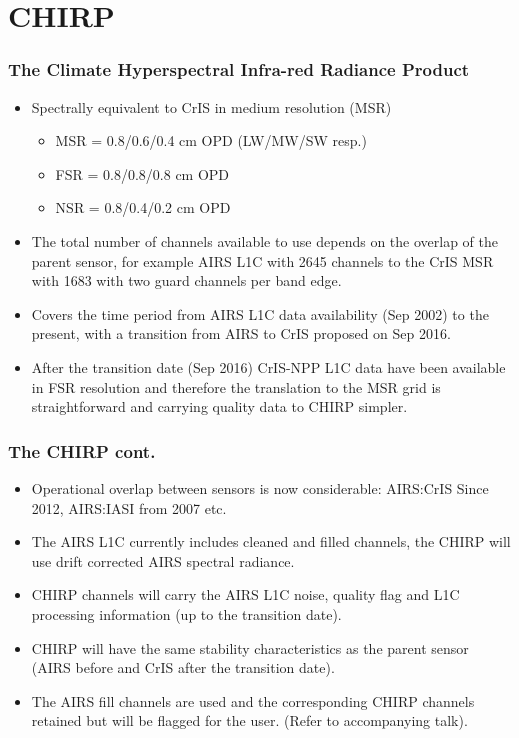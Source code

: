 \documentclass[10pt,t]{beamer}
\begin{document}
\section{CHIRP}
\begin{frame}
  \frametitle{The Climate Hyperspectral Infra-red Radiance Product}
  \begin{itemize}
  \item Spectrally equivalent to CrIS in medium resolution (MSR)
    \begin{itemize}
    \item MSR = 0.8/0.6/0.4 cm OPD (LW/MW/SW resp.)
    \item FSR = 0.8/0.8/0.8 cm OPD
    \item NSR = 0.8/0.4/0.2 cm OPD
    \end{itemize}
    
  \item The total number of channels available to use depends on the overlap of the parent sensor, for example AIRS L1C with 2645 channels to the CrIS MSR with 1683 with two guard channels per band edge.
  \item Covers the time period from AIRS L1C data availability (Sep 2002) to the present, with a transition from AIRS to CrIS proposed on Sep 2016.
      \item After the transition date (Sep 2016) CrIS-NPP L1C data have been available in FSR resolution and therefore the translation to the MSR grid is straightforward and carrying quality data to CHIRP simpler.

  \end{itemize}
\end{frame}

\begin{frame}
  \frametitle{The CHIRP cont.}
  \begin{itemize}
   \item Operational overlap between sensors is now considerable: AIRS:CrIS Since 2012, AIRS:IASI from 2007 etc.
  \item The AIRS L1C currently includes cleaned and filled channels, the CHIRP will use drift corrected AIRS spectral radiance.
  \item CHIRP channels will carry the AIRS L1C noise, quality flag and L1C processing information (up to the transition date).
    \item CHIRP will have the same stability characteristics as the parent sensor (AIRS before and CrIS after the transition date).
  \item The AIRS fill channels are used and the corresponding CHIRP channels retained but will be flagged for the user. (Refer to accompanying talk).

  \end{itemize}
\end{frame}
\end{document}

